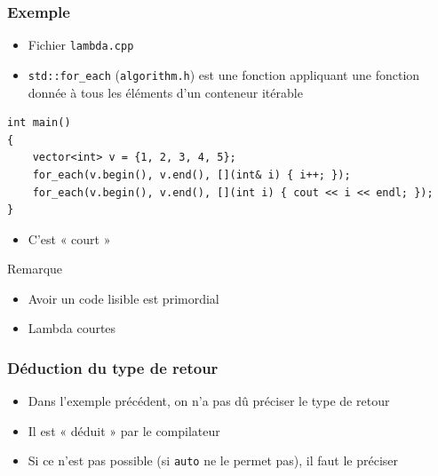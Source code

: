 \begin{frame}[containsverbatim]
\frametitle{Exemple}
\begin{itemize}
\item Fichier \texttt{lambda.cpp}
\item \texttt{std::for\_each} (\texttt{algorithm.h}) est une fonction appliquant une fonction donnée à tous les éléments d'un conteneur itérable
\end{itemize}
\begin{lstlisting}
int main()
{
	vector<int> v = {1, 2, 3, 4, 5};
	for_each(v.begin(), v.end(), [](int& i) { i++; });
	for_each(v.begin(), v.end(), [](int i) { cout << i << endl; });
}
\end{lstlisting}
\begin{itemize}
\item C'est « court »
\end{itemize}
\begin{alertblock}{Remarque}
	\begin{itemize}
	\item Avoir un code lisible est primordial
	\item Lambda courtes
	\end{itemize}
\end{alertblock}
\end{frame}

\begin{frame}
\frametitle{Déduction du type de retour}
\begin{itemize}
 \item Dans l'exemple précédent, on n'a pas dû préciser le type de retour
 \item Il est « déduit » par le compilateur
 \item Si ce n'est pas possible (si \lstinline|auto| ne le permet pas), il faut le préciser
\end{itemize}
\begin{center}
\end{center}
\end{frame}

